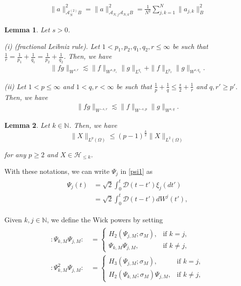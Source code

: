 \documentclass[10pt,a4paper]{amsart}
\newtheorem{lemma}{Lemma}
\newcommand{\A}{\mathcal{A}}
\newcommand{\D}{\mathcal{D}}
\renewcommand{\H}{\mathcal{H}}
\newcommand{\N}{\mathbb{N}}
\renewcommand{\O}{\Omega}
\newcommand{\les}{\lesssim}
\newcommand{\noi}{\noindent}
\newcommand{\wick}[1]{:\!{#1}\!:}
\begin{document}
\begin{align}
\|  a \|_{\A_N^{(2)} B}^2 
= \|  a \|_{\A_{N, j} \A_{N, k}  B}^2 
=  \frac{1}{N^2} \sum_{j, k = 1}^N \| a_{j, k} \|_B^2
\label{AN2} 
\end{align} 

\begin{lemma}
\label{LEM:prod}
Let $s > 0$.

\smallskip \noi
\textup{(i) (fractional Leibniz rule).} Let $1 < p_1, p_2, q_1, q_2, r \leq \infty$ be such that $\frac{1}{r} = \frac{1}{p_1} + \frac{1}{q_1} = \frac{1}{p_2} + \frac{1}{q_2}$. Then, we have
\begin{align*}
    \| f g \|_{W^{s, r}} \les \| f \|_{W^{s, p_1}} \| g \|_{L^{q_1}} + \| f \|_{L^{p_2}} \| g \|_{W^{s, q_2}}.
\end{align*}

\smallskip \noi
\textup{(ii)} Let $1 < p \leq \infty$ and $1 < q, r < \infty$ be such that 
$ \frac{1}{p} + \frac{1}{q}\le \frac s2 +  \frac{1}{r}$ and $q, r' \geq p'$. Then, we have
\begin{align*}
    \| f g \|_{W^{-s, r}} \les \| f \|_{W^{-s, p}} \| g \|_{W^{s, q}}.
\end{align*}
\end{lemma}

\begin{lemma}\label{LEM:hyp}
Let $k \in \N$.
Then, we have
\begin{equation*}
\|X \|_{L^p(\O)} \leq (p-1)^\frac{k}{2} \|X\|_{L^2(\O)}
 \end{equation*}
 
 \noi
 for any $p \geq 2$
 and $X \in \H_{\leq k}$.



\end{lemma}

With these notations, we can write 
 $\Psi_j$  in \eqref{psi1}
as 
\begin{align}
\begin{split}
\Psi_j (t) 
& =
\sqrt 2  \int_0^t \D (t - t') \xi_j (dt')\\
& = \sqrt 2  \int_0^t \D (t - t') d W^j (t'),
\end{split}
\label{psi2}
\end{align}

Given $k, j \in \N$, we define
the Wick powers by setting
\begin{align}
\begin{split}
\wick{ \Psi_{k, M} \Psi_{j, M} } \, 
& = 
\begin{cases}
        H_2 ( \Psi_{j, M}; \sigma_M ), &  \text{if } k = j,  \\
\Psi_{k, M} \Psi_{j, M}, & \text{if } k \neq j,
    \end{cases} \\
\wick{ \Psi_{k, M}^2 \Psi_{j, M} } \, 
& = 
\begin{cases}
H_3 ( \Psi_{j, M}; \sigma_M ),  & \text{if } k = j,  \\
H_2 ( \Psi_{k, M}; \sigma_M ) \Psi_{j, M},  & \text{if } k \neq j,
\end{cases}
\end{split}
\label{psi3}
\end{align}
\end{document}
